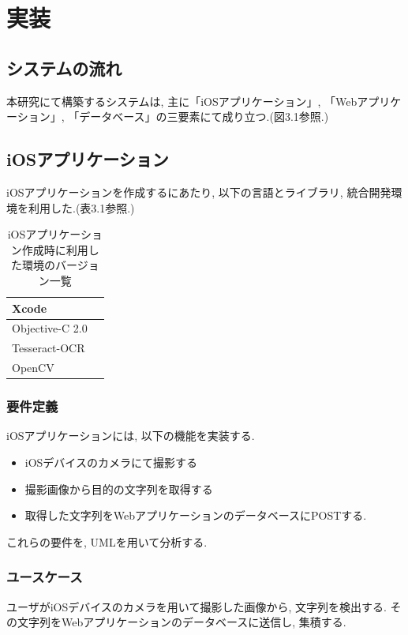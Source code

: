 \chapter{実装}
\label{chap:poordirection}

\section{システムの流れ}
本研究にて構築するシステムは, 主に「iOSアプリケーション」, 「Webアプリケーション」, 「データベース」の三要素にて成り立つ.(図3.1参照.)

\section{iOSアプリケーション}
iOSアプリケーションを作成するにあたり, 以下の言語とライブラリ, 統合開発環境を利用した.(表3.1参照.)

\begin{table}
\begin{center}
\begin{tabular}{|l|l|} \hline
Xcode &  \\ \hline
Objective-C 2.0 & \\ \hline
Tesseract-OCR & \\ \hline
OpenCV & \\ \hline
\end{tabular}
\end{center}
\caption{iOSアプリケーション作成時に利用した環境のバージョン一覧}
\end{table}

\subsection{要件定義}
iOSアプリケーションには, 以下の機能を実装する.
\begin{itemize}
\item iOSデバイスのカメラにて撮影する

\item 撮影画像から目的の文字列を取得する

\item 取得した文字列をWebアプリケーションのデータベースにPOSTする.
\end{itemize}

これらの要件を, UMLを用いて分析する.

\subsection{ユースケース}
ユーザがiOSデバイスのカメラを用いて撮影した画像から, 文字列を検出する.
その文字列をWebアプリケーションのデータベースに送信し, 集積する.

